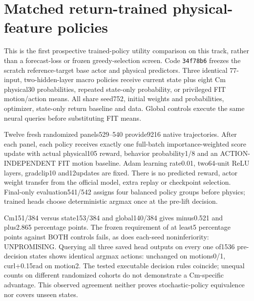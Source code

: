 \documentclass[10 pt]{article}
\begin{document}
\section{Matched return-trained physical-feature policies}
This is the first prospective trained-policy utility comparison on this track,
rather than a forecast-loss or frozen greedy-selection screen. Code
\texttt{34f78b6} freezes the scratch reference-target base actor and physical
predictors. Three identical 77-input, two-hidden-layer macro policies receive
current state plus eight Cm physical30 probabilities, repeated state-only
probability, or privileged FIT motion/action means. All share seed752, initial
weights and probabilities, optimizer, state-only return baseline and data.
Global controls execute the same neural queries before substituting FIT means.

Twelve fresh randomized panels529--540 provide9216 native trajectories. After
each panel, each policy receives exactly one full-batch importance-weighted score
update with actual physical105 reward, behavior probability1/8 and an
ACTION-INDEPENDENT FIT motion baseline. Adam learning rate0.01, two64-unit ReLU
layers, gradclip10 and12updates are fixed. There is no predicted reward, actor
weight transfer from the official model, extra replay or checkpoint selection.
Final-only evaluation541/542 assigns four balanced policy groups before physics;
trained heads choose deterministic argmax once at the pre-lift decision.

\begin{table}[ht]\centering

\caption{Fresh physical105 counts for executed policies. Each all-motion policy
has384 trajectories; each seed192 and each motion128. All motions are retained.
Single optimization seed: exploratory Probe only.}
\end{table}

Cm151/384 versus state153/384 and global140/384 gives minus0.521 and plus2.865
percentage points. The frozen requirement of at least5 percentage points against
BOTH controls fails, as does each-seed noninferiority: UNPROMISING. Querying all
three saved head outputs on every one of1536 pre-decision states shows identical
argmax actions: unchanged on motions0/1, curl+0.15rad on motion2. The tested
executable decision rules coincide; unequal counts on different randomized
cohorts do not demonstrate a Cm-specific advantage. This observed agreement
neither proves stochastic-policy equivalence nor covers unseen states.
\end{document}
